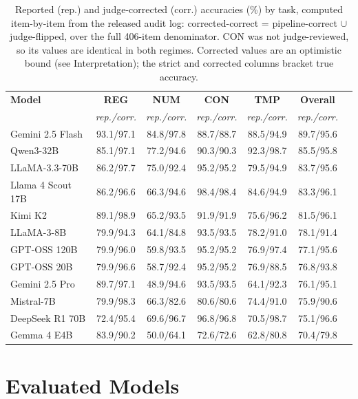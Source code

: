 \documentclass[11pt]{article}
\begin{document}
\begin{table}[t]
\centering\footnotesize
\begin{tabular}{lcccccc}
\toprule
\textbf{Model} & \textbf{REG} & \textbf{NUM} & \textbf{CON} & \textbf{TMP} & \textbf{Overall} \\
 & \textit{rep./corr.} & \textit{rep./corr.} & \textit{rep./corr.} & \textit{rep./corr.} & \textit{rep./corr.} \\
\midrule
Gemini 2.5 Flash & 93.1/97.1 & 84.8/97.8 & 88.7/88.7 & 88.5/94.9 & 89.7/95.6 \\
Qwen3-32B & 85.1/97.1 & 77.2/94.6 & 90.3/90.3 & 92.3/98.7 & 85.5/95.8 \\
LLaMA-3.3-70B & 86.2/97.7 & 75.0/92.4 & 95.2/95.2 & 79.5/94.9 & 83.7/95.6 \\
Llama 4 Scout 17B & 86.2/96.6 & 66.3/94.6 & 98.4/98.4 & 84.6/94.9 & 83.3/96.1 \\
Kimi K2 & 89.1/98.9 & 65.2/93.5 & 91.9/91.9 & 75.6/96.2 & 81.5/96.1 \\
LLaMA-3-8B & 79.9/94.3 & 64.1/84.8 & 93.5/93.5 & 78.2/91.0 & 78.1/91.4 \\
GPT-OSS 120B & 79.9/96.0 & 59.8/93.5 & 95.2/95.2 & 76.9/97.4 & 77.1/95.6 \\
GPT-OSS 20B & 79.9/96.6 & 58.7/92.4 & 95.2/95.2 & 76.9/88.5 & 76.8/93.8 \\
Gemini 2.5 Pro & 89.7/97.1 & 48.9/94.6 & 93.5/93.5 & 64.1/92.3 & 76.1/95.1 \\
Mistral-7B & 79.9/98.3 & 66.3/82.6 & 80.6/80.6 & 74.4/91.0 & 75.9/90.6 \\
DeepSeek R1 70B & 72.4/95.4 & 69.6/96.7 & 96.8/96.8 & 70.5/98.7 & 75.1/96.6 \\
Gemma 4 E4B & 83.9/90.2 & 50.0/64.1 & 72.6/72.6 & 62.8/80.8 & 70.4/79.8 \\
\bottomrule
\end{tabular}
\caption{Reported (rep.) and judge-corrected (corr.) accuracies (\%) by task, computed item-by-item from the released audit log: corrected-correct = pipeline-correct $\cup$ judge-flipped, over the full 406-item denominator. CON was not judge-reviewed, so its values are identical in both regimes. Corrected values are an optimistic bound (see Interpretation); the strict and corrected columns bracket true accuracy.}
\label{tab:d1}
\end{table}

\section{Evaluated Models}
\label{app:models}
\end{document}
